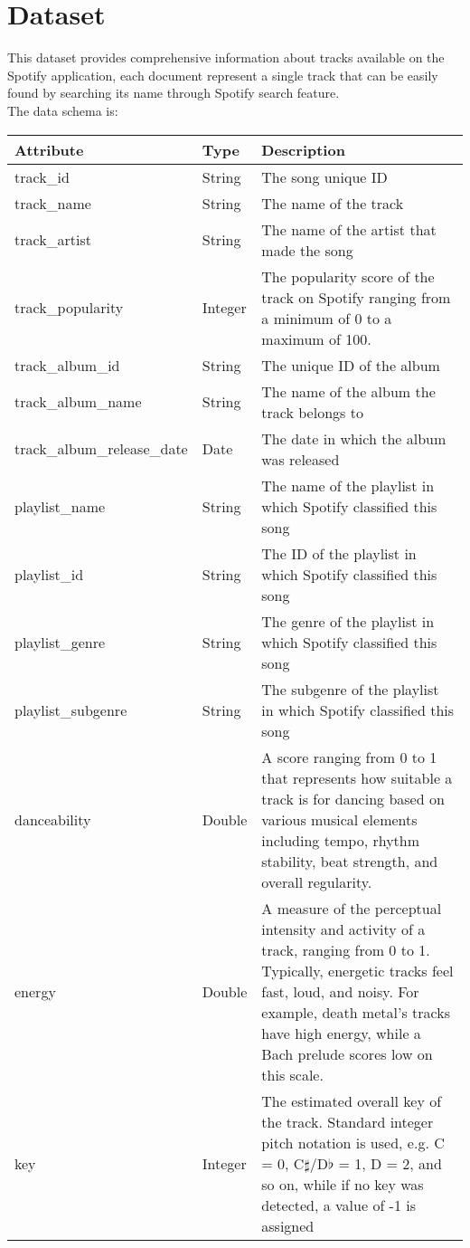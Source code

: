 \section{Dataset}
This dataset provides comprehensive information about tracks available on the Spotify application, each document represent a single track that can be easily found by searching its name through Spotify search feature.\\
The data schema is:
\begin{table}[h!]
	\begin{center}
		\begin{tabular}{|m{12em}|m{4em}|m{25em}|}
		\hline
		\textbf{Attribute} & \textbf{Type} & \textbf{Description}\\
		\hline
			track\_id & String & The song unique ID\\
		\hline
			track\_name & String & The name of the track\\
		\hline
			track\_artist & String & The name of the artist that made the song\\
		\hline
			track\_popularity & Integer & The popularity score of the track on Spotify ranging from a minimum of 0 to a maximum of 100.\\
		\hline
			track\_album\_id & String & The unique ID of the album\\
		\hline
			track\_album\_name & String & The name of the album the track belongs to\\
		\hline
			track\_album\_release\_date & Date & The date in which the album was released\\
		\hline
			playlist\_name & String & The name of the playlist in which Spotify classified this song\\
		\hline
			playlist\_id & String & The ID of the playlist in which Spotify classified this song\\
		\hline
			playlist\_genre & String & The genre of the playlist in which Spotify classified this song\\
		\hline
			playlist\_subgenre & String & The subgenre of the playlist in which Spotify classified this song\\
		\hline
			danceability & Double & A score ranging from 0 to 1 that represents how suitable a track is for dancing based on various musical elements including tempo, rhythm stability, beat strength, and overall regularity.\\
		\hline
			energy & Double & A measure of the perceptual intensity and activity of a track, ranging from 0 to 1. Typically, energetic tracks feel fast, loud, and noisy. For example, death metal's tracks have high energy, while a Bach prelude scores low on this scale.\\
		\hline
			key & Integer & The estimated overall key of the track. Standard integer pitch notation is used, e.g. C = 0, C$\sharp$/D$\flat$ = 1, D = 2, and so on, while if no key was detected, a value of -1 is assigned\\
		\hline
		\end{tabular}
	\end{center}
\end{table}\newpage

